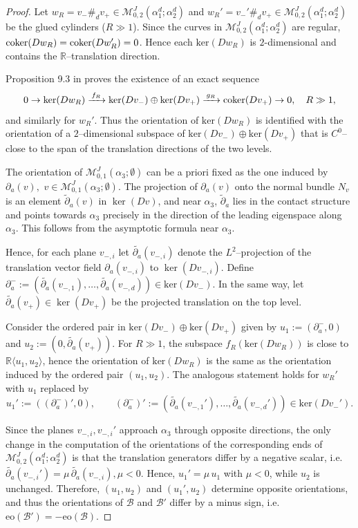 \documentclass{amsart}
\newcommand{\R}{\mathbb{R}}
\newcommand{\M}{\mathcal{M}}
\newcommand{\Ker}{\mathrm{ker}}
\newcommand{\eo}{\mathrm{eo}}
\begin{document}
\begin{proof}
Let $w_R=v_-\#_d v_+\in \M^{J}_{0,2}(\alpha_{1}^d;\alpha_{2}^d)$ and $w_R'=v_-'\#_d v_+\in \M^{J}_{0,2}(\alpha_{1}^d;\alpha_{2}^d)$ be the glued cylinders ($R\gg 1$).
Since the curves in $\M^J_{0,2}(\alpha_1^d;\alpha_2^d)$ are regular, ${\rm coker}(Dw_R)={\rm coker}(Dw_R')=0$.
Hence each $\Ker(Dw_R)$ is $2$-dimensional and contains the $\R$--translation direction.

Proposition 9.3 in \cite{hutchings2009} proves the existence of an exact sequence
$$
0\to \Ker(Dw_R)\xrightarrow{\,f_R\,}\Ker(Dv_-)\oplus\Ker(Dv_+)\xrightarrow{\,g_R\,}  {\rm coker}(Dv_+)\to 0, \quad R \gg 1,
$$
and similarly for $w_R'$. Thus the orientation of $\Ker(Dw_R)$ is identified with the orientation of a
$2$–dimensional subspace of
$
\Ker(Dv_-)\oplus \Ker(Dv_+)
$
that is $C^0$–close to the span of the translation directions of the two levels.


The orientation of $\mathcal M^J_{0,1}(\alpha_3; \emptyset)$ can be a priori fixed as the one induced by $\partial_a(v),$ $v\in \mathcal M^J_{0,1}(\alpha_3; \emptyset)$. The projection of $\partial_a(v)$ onto the normal bundle $N_v$ is an element $\widetilde \partial_a(v)$ in $\ker (Dv)$, and near $\alpha_3$, $\widetilde \partial_a$ lies in the contact structure and points towards $\alpha_3$ precisely in the direction of the leading eigenspace along $\alpha_3$. This follows from the asymptotic formula near $\alpha_3$.

Hence, for each plane $v_{-,i}$ let $\widetilde{\partial_a}(v_{-,i})$ denote the $L^2$--projection of the
translation vector field $\partial_a(v_{-,i})$ to $\ker(Dv_{-,i})$.
Define
$
\partial_a^- :=
(\widetilde{\partial_a}(v_{-,1}),\ldots,\widetilde{\partial_a}(v_{-,d}))
\in \Ker(Dv_-).
$
In the same way, let $\widetilde{\partial_a}(v_+)\in \ker(Dv_+)$ be the projected translation on
the top level.

Consider the ordered pair in $\Ker(Dv_-)\oplus\Ker(Dv_+)$ given by
$u_1 := (\partial_a^-,0)$ and $u_2 := (0,\widetilde{\partial_a}(v_+)).$
For $R\gg 1$, the subspace $f_R(\Ker(Dw_R))$ is close to $\R\langle u_1,u_2\rangle$, hence the
orientation of $\Ker(Dw_R)$ is the same as the orientation induced by the ordered pair $(u_1,u_2)$.
The analogous statement holds for $w_R'$ with $u_1$ replaced by
\[
u_1' := ((\partial_a^-)',0),
\qquad
(\partial_a^-)' :=
(\widetilde{\partial_a}(v_{-,1}'),\ldots,\widetilde{\partial_a}(v_{-,d}'))
\in \Ker(Dv_-').
\]


Since the planes $v_{-,i},v_{-,i}'$ approach $\alpha_3$ through opposite 
directions, the only change in the computation of the orientations of the corresponding ends of $\mathcal M^J_{0,2}(\alpha_1^d ; \alpha_2^d)$ is that the translation generators differ by a negative scalar, i.e.
$
\widetilde{\partial_a}(v_{-,i}')=\mu\,\widetilde{\partial_a}(v_{-,i}), \mu<0.
$
Hence, $u_1'=\mu\,u_1$ with $\mu<0$, while $u_2$ is unchanged.
Therefore, $(u_1,u_2)$ and $(u_1',u_2)$ determine opposite orientations, and thus the orientations of $\mathcal B$ and $\mathcal B'$ differ by a minus sign, i.e. 
$\eo(\mathcal B')=-\eo(\mathcal B)$. \end{proof}
\end{document}
